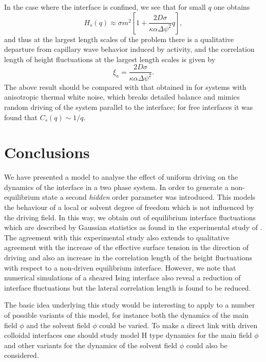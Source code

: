 In the case where the interface is confined, we see that for small $q$ one obtains
\begin{equation}
H_s(q) \approx \sigma m^2 \left[ 1+ \frac{2D\sigma }{\kappa\alpha \Delta\psi^2}q\right],
\end{equation}
and thus at the largest length scales of the problem there is a qualitative departure from capillary wave behavior induced by activity, and the correlation length of height fluctuations at the largest length scales is given by
\begin{equation}
\xi_a = \frac{2D\sigma }{\kappa\alpha \Delta\psi^2}.
\end{equation}
The above result should be compared with that obtained in \cite{zia1991} for 
systems with anisotropic thermal white noise, which breaks detailed balance and mimics random driving of the system parallel to the interface; for free interfaces it was found that $C_s(q)\sim 1/q$.
\section{Conclusions}
We have presented a model to analyse the effect of uniform driving on the dynamics of the interface in a two phase system. In order to generate a non-equilibrium state a second {\em hidden} order parameter was introduced. This models the behaviour of a local or solvent degree of freedom which is not influenced by the driving field. In this way, we obtain out of equilibrium interface fluctuations which are described by Gaussian statistics as found in the experimental study of \cite{derks2006}. The agreement with this experimental study also extends to qualitative agreement with the increase of the effective surface tension in the direction of driving and also an increase in the correlation length of the height fluctuations with respect to a non-driven equilibrium interface. However, we  note that numerical simulations of a sheared Ising interface \cite{smith2008,smith2010} also reveal a reduction of interface fluctuations but the lateral correlation length is found to be reduced.

The basic idea underlying this study would be interesting to apply to a number of possible variants of this model, for instance both the dynamics
of the main field $\phi$ and the solvent field $\phi$ could be varied. To make a direct link with driven colloidal interfaces one should study model H type dynamics for the main field $\phi$ and other variants for the dynamics of the 
solvent field $\phi$ could also be considered. 

